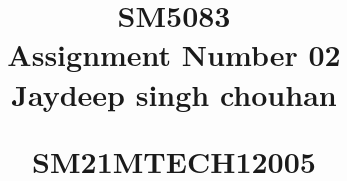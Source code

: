 \documentclass[journal,12pt,twocolumn]{IEEEtran}
\begin{document}
%


\newtheorem{theorem}{Theorem}[section]
\newtheorem{problem}{Problem}
\newtheorem{proposition}{Proposition}[section]
\newtheorem{lemma}{Lemma}[section]
\newtheorem{corollary}[theorem]{Corollary}
\newtheorem{example}{Example}[section]
\newtheorem{definition}[problem]{Definition}
\newcommand{\BEQA}{\begin{eqnarray}}
\newcommand{\EEQA}{\end{eqnarray}}
\newcommand{\define}{\stackrel{\triangle}{=}}

\providecommand{\mbf}{\mathbf}
\providecommand{\pr}[1]{\ensuremath{\Pr\left(#1\right)}}
\providecommand{\qfunc}[1]{\ensuremath{Q\left(#1\right)}}
\providecommand{\sbrak}[1]{\ensuremath{{}\left[#1\right]}}
\providecommand{\lsbrak}[1]{\ensuremath{{}\left[#1\right.}}
\providecommand{\rsbrak}[1]{\ensuremath{{}\left.#1\right]}}
\providecommand{\brak}[1]{\ensuremath{\left(#1\right)}}
\providecommand{\lbrak}[1]{\ensuremath{\left(#1\right.}}
\providecommand{\rbrak}[1]{\ensuremath{\left.#1\right)}}
\providecommand{\cbrak}[1]{\ensuremath{\left\{#1\right\}}}
\providecommand{\lcbrak}[1]{\ensuremath{\left\{#1\right.}}
\providecommand{\rcbrak}[1]{\ensuremath{\left.#1\right\}}}
\theoremstyle{remark}
\newtheorem{rem}{Remark}
\newcommand{\sgn}{\mathop{\mathrm{sgn}}}
\providecommand{\abs}[1]{\lvert#1\rvert}
\providecommand{\res}[1]{\Res\displaylimits_{#1}} 
\providecommand{\norm}[1]{\lVert#1\rVert}
\providecommand{\mtx}[1]{\mathbf{#1}}
\providecommand{\fourier}{\overset{\mathcal{F}}{ \rightleftharpoons}}
\providecommand{\system}{\overset{\mathcal{H}}{ \longleftrightarrow}}
\newcommand{\solution}{\noindent \textbf{Solution: }}
\newcommand{\cosec}{\,\text{cosec}\,}
\providecommand{\dec}[2]{\ensuremath{\overset{#1}{\underset{#2}{\gtrless}}}}
\newcommand{\myvec}[1]{\ensuremath{\begin{pmatrix}#1\end{pmatrix}}}
\newcommand{\cmyvec}[1]{\ensuremath{\begin{pmatrix*}[c]#1\end{pmatrix*}}}
\newcommand{\mydet}[1]{\ensuremath{\begin{vmatrix}#1\end{vmatrix}}}
\newcommand{\proj}[2]{\textbf{proj}_{\vec{#1}}\vec{#2}}
\newcommand{\RNum}[1]{\uppercase\expandafter{\romannumeral #1\relax}}
\let\StandardTheFigure\thefigure
\let\vec\mathbf
\title{
\LARGE SM5083\\
    \LARGE Assignment Number 02 \\[0.5em]
    
    \large Jaydeep singh chouhan\par
    \large   SM21MTECH12005  \par
}
\maketitle
\renewcommand{\thefigure}{\theenumi}
\renewcommand{\thetable}{\theenumi}
\end{document}
